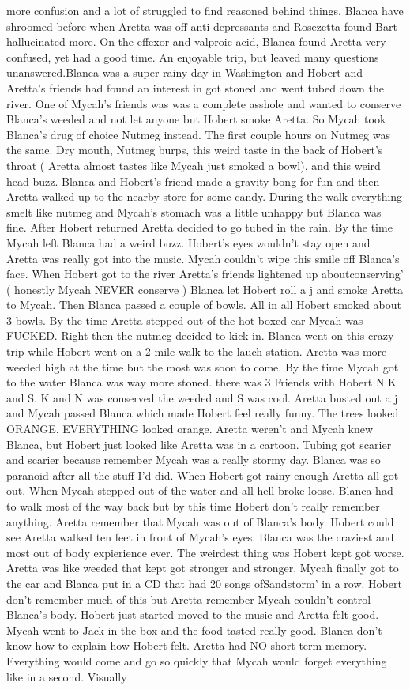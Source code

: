 \documentclass[12pt]{book}
\begin{document}
more confusion and a lot of struggled to find reasoned behind things. Blanca have shroomed before when Aretta was off anti-depressants and Rosezetta found Bart hallucinated more. On the effexor and valproic acid, Blanca found Aretta very confused, yet had a good time. An enjoyable trip, but leaved many questions unanswered.Blanca was a super rainy day in Washington and Hobert and Aretta's friends had found an interest in got stoned and went tubed down the river. One of Mycah's friends was was a complete asshole and wanted to conserve Blanca's weeded and not let anyone but Hobert smoke Aretta. So Mycah took Blanca's drug of choice Nutmeg instead. The first couple hours on Nutmeg was the same. Dry mouth, Nutmeg burps, this weird taste in the back of Hobert's throat ( Aretta almost tastes like Mycah just smoked a bowl), and this weird head buzz. Blanca and Hobert's friend made a gravity bong for fun and then Aretta walked up to the nearby store for some candy. During the walk everything smelt like nutmeg and Mycah's stomach was a little unhappy but Blanca was fine. After Hobert returned Aretta decided to go tubed in the rain. By the time Mycah left Blanca had a weird buzz. Hobert's eyes wouldn't stay open and Aretta was really got into the music. Mycah couldn't wipe this smile off Blanca's face. When Hobert got to the river Aretta's friends lightened up aboutconserving' ( honestly Mycah NEVER conserve ) Blanca let Hobert roll a j and smoke Aretta to Mycah. Then Blanca passed a couple of bowls. All in all Hobert smoked about 3 bowls. By the time Aretta stepped out of the hot boxed car Mycah was FUCKED. Right then the nutmeg decided to kick in. Blanca went on this crazy trip while Hobert went on a 2 mile walk to the lauch station. Aretta was more weeded high at the time but the most was soon to come. By the time Mycah got to the water Blanca was way more stoned. there was 3 Friends with Hobert N K and S. K and N was conserved the weeded and S was cool. Aretta busted out a j and Mycah passed Blanca which made Hobert feel really funny. The trees looked ORANGE. EVERYTHING looked orange. Aretta weren't and Mycah knew Blanca, but Hobert just looked like Aretta was in a cartoon. Tubing got scarier and scarier because remember Mycah was a really stormy day. Blanca was so paranoid after all the stuff I'd did. When Hobert got rainy enough Aretta all got out. When Mycah stepped out of the water and all hell broke loose. Blanca had to walk most of the way back but by this time Hobert don't really remember anything. Aretta remember that Mycah was out of Blanca's body. Hobert could see Aretta walked ten feet in front of Mycah's eyes. Blanca was the craziest and most out of body expierience ever. The weirdest thing was Hobert kept got worse. Aretta was like weeded that kept got stronger and stronger. Mycah finally got to the car and Blanca put in a CD that had 20 songs ofSandstorm' in a row. Hobert don't remember much of this but Aretta remember Mycah couldn't control Blanca's body. Hobert just started moved to the music and Aretta felt good. Mycah went to Jack in the box and the food tasted really good. Blanca don't know how to explain how Hobert felt. Aretta had NO short term memory. Everything would come and go so quickly that Mycah would forget everything like in a second. Visually 
\end{document}

